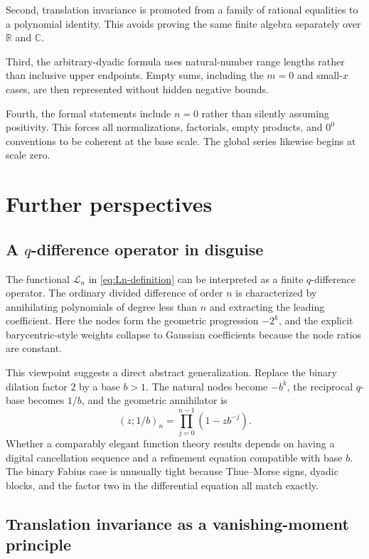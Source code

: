 \documentclass[11pt]{article}
\theoremstyle{definition}
\newcommand{\R}{\mathbb{R}}
\newcommand{\C}{\mathbb{C}}
\newcommand{\qpoch}[3]{\left(#1;#2\right)_{#3}}
\begin{document}
Second, translation invariance is promoted from a family of rational equalities to a polynomial identity.  This avoids proving the same finite algebra separately over $\R$ and $\C$.

Third, the arbitrary-dyadic formula uses natural-number range lengths rather than inclusive upper endpoints.  Empty sums, including the $m=0$ and small-$x$ cases, are then represented without hidden negative bounds.

Fourth, the formal statements include $n=0$ rather than silently assuming positivity.  This forces all normalizations, factorials, empty products, and $0^0$ conventions to be coherent at the base scale.  The global series likewise begins at scale zero.

\section{Further perspectives}
\label{sec:further-perspectives}

\subsection{A \texorpdfstring{$q$}{q}-difference operator in disguise}

The functional $\mathcal L_n$ in \cref{eq:Ln-definition} can be interpreted as a finite $q$-difference operator.  The ordinary divided difference of order $n$ is characterized by annihilating polynomials of degree less than $n$ and extracting the leading coefficient.  Here the nodes form the geometric progression $-2^k$, and the explicit barycentric-style weights collapse to Gaussian coefficients because the node ratios are constant.

This viewpoint suggests a direct abstract generalization.  Replace the binary dilation factor $2$ by a base $b>1$.  The natural nodes become $-b^k$, the reciprocal $q$-base becomes $1/b$, and the geometric annihilator is
\begin{equation}
  \qpoch{z}{1/b}{n}=\prod_{j=0}^{n-1}(1-zb^{-j}).
  \label{eq:base-b-annihilator}
\end{equation}
Whether a comparably elegant function theory results depends on having a digital cancellation sequence and a refinement equation compatible with base $b$.  The binary Fabius case is unusually tight because Thue--Morse signs, dyadic blocks, and the factor two in the differential equation all match exactly.

\subsection{Translation invariance as a vanishing-moment principle}
\end{document}
